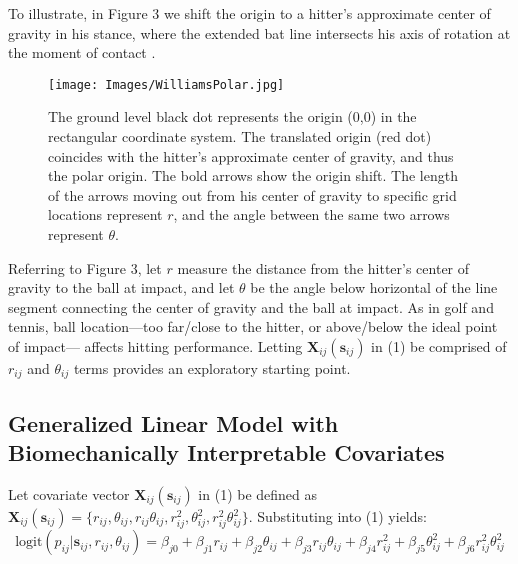 \documentclass{article}
\begin{document}
To illustrate, in Figure 3 we shift the origin to a hitter's approximate center of gravity in his stance, where the extended bat line intersects his axis of rotation at the moment of contact \citep{Welch1995}. 


  \begin{figure}[H]
	\centering
	\texttt{[image: Images/WilliamsPolar.jpg]} 
	\caption{The ground level black dot represents the origin (0,0) in the rectangular coordinate system. The translated origin (red dot) coincides with the hitter's approximate center of gravity, and thus the polar origin. The bold arrows show the origin shift. The length of the arrows moving out from his center of gravity to specific grid locations represent $r$, and the angle between the same two arrows represent $\theta$.}
	\end{figure} 
Referring to Figure 3, let $r$ measure the distance from the hitter's center of gravity to the ball at impact, and let $\theta$ be the angle below horizontal of the line segment connecting the center of gravity and the ball at impact. As in golf and tennis, ball location---too far/close to the hitter, or above/below the ideal point of impact--- affects hitting performance. Letting $\pmb{X}_{ij}(\pmb{s}_{ij})$ in (1) be comprised of $r_{ij}$ and $\theta_{ij}$ terms provides an exploratory starting point.

\subsection{Generalized Linear Model with Biomechanically Interpretable Covariates} 

Let covariate vector $\pmb{X}_{ij}(\pmb{s}_{ij})$ in (1) be defined as $\pmb{X}_{ij}(\pmb{s}_{ij}) = \{r_{ij}, \theta_{ij}, r_{ij}\theta_{ij}, r_{ij}^{2}, \theta_{ij}^{2}, r_{ij}^{2}\theta_{ij}^{2}\}$. Substituting into (1) yields:
\begin{equation}
\text{logit}(p_{ij}|\pmb{s}_{ij}, r_{ij}, \theta_{ij}) = \beta_{j0} + \beta_{j1}r_{ij} + \beta_{j2} \theta_{ij} + \beta_{j3} r_{ij} \theta_{ij} + \beta_{j4}r_{ij}^{2} + \beta_{j5} \theta_{ij}^{2} + \beta_{j6} r_{ij}^{2} \theta_{ij}^{2}
\end{equation}
\end{document}
